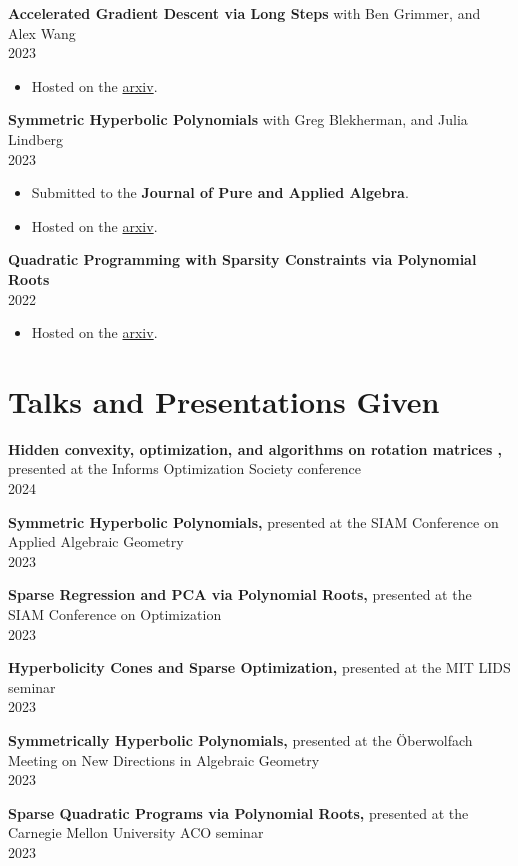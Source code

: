 \documentclass[margin]{res}
\begin{document}
\begin{resume}
{\bf  Accelerated Gradient Descent via Long Steps} with Ben Grimmer, and Alex Wang \\ 2023
\begin{itemize} \itemsep -2pt %
\item Hosted on the \href{https://arxiv.org/abs/2309.09961}{arxiv}.
\end{itemize}


{\bf  Symmetric Hyperbolic Polynomials} with Greg Blekherman, and Julia Lindberg \\ 2023
\begin{itemize} \itemsep -2pt %
\item Submitted to the \textbf{Journal of Pure and Applied Algebra}.
\item Hosted on the \href{https://arxiv.org/abs/2308.09653}{arxiv}.
\end{itemize}
{\bf  Quadratic Programming with Sparsity Constraints via Polynomial Roots } \\ 2022
\begin{itemize} \itemsep -2pt %
\item Hosted on the \href{https://arxiv.org/abs/2208.11143}{arxiv}.
\end{itemize}

\section{Talks and Presentations Given}
{\bf  Hidden convexity, optimization, and algorithms on rotation matrices  ,} presented at the Informs Optimization Society conference \\ 2024 

{\bf  Symmetric Hyperbolic Polynomials,} presented at the SIAM Conference on Applied Algebraic Geometry \\ 2023 

{\bf  Sparse Regression and PCA via Polynomial Roots,} presented at the SIAM Conference on Optimization \\ 2023 

{\bf  Hyperbolicity Cones and Sparse Optimization,} presented at the MIT LIDS seminar \\ 2023 

{\bf  Symmetrically Hyperbolic Polynomials,} presented at the \"Oberwolfach Meeting on New Directions in Algebraic Geometry \\ 2023 

{\bf  Sparse Quadratic Programs via Polynomial Roots,} presented at the Carnegie Mellon University ACO seminar \\ 2023 


\end{resume}
\end{document}
